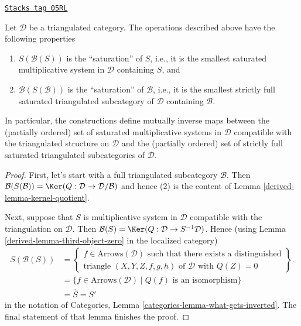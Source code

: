 \begin{lemma}[Operations]
\label{derived-lemma-operations}
\href{https://stacks.math.columbia.edu/tag/05RL}{\texttt{Stacks tag 05RL}}

Let $\mathcal{D}$ be a triangulated category. The operations described above
have the following properties
\begin{enumerate}
\item $S(\mathcal{B}(S))$ is the ``saturation'' of $S$, i.e., it is the
smallest saturated multiplicative system in $\mathcal{D}$ containing $S$, and
\item $\mathcal{B}(S(\mathcal{B}))$ is the ``saturation'' of $\mathcal{B}$,
i.e., it is the smallest strictly full saturated triangulated subcategory of
$\mathcal{D}$ containing $\mathcal{B}$.
\end{enumerate}
In particular, the constructions define mutually inverse maps between
the (partially ordered) set of saturated multiplicative systems in
$\mathcal{D}$ compatible with the triangulated structure on $\mathcal{D}$
and
the (partially ordered) set of strictly full saturated triangulated
subcategories of $\mathcal{D}$.
\end{lemma}

\begin{proof}

First, let's start with a full triangulated subcategory $\mathcal{B}$. Then
$\mathcal{B}(S(\mathcal{B})) =
\Ker(Q : \mathcal{D} \to \mathcal{D}/\mathcal{B})$
and hence (2) is the content of
Lemma \ref{derived-lemma-kernel-quotient}.

\medskip\noindent
Next, suppose that $S$ is multiplicative system in $\mathcal{D}$ compatible
with the triangulation on $\mathcal{D}$. Then
$\mathcal{B}(S) = \Ker(Q : \mathcal{D} \to S^{-1}\mathcal{D})$.
Hence (using
Lemma \ref{derived-lemma-third-object-zero}
in the localized category)
\begin{align*}
S(\mathcal{B}(S))
& =
\left\{
\begin{matrix}
f \in \text{Arrows}(\mathcal{D})
\text{ such that there exists a distinguished}\\
\text{triangle }(X, Y, Z, f, g, h) \text{ of }\mathcal{D}\text{ with }Q(Z) = 0
\end{matrix}
\right\}.
\\
& =
\{f \in \text{Arrows}(\mathcal{D}) \mid Q(f)\text{ is an isomorphism}\} \\
& = \hat S = S'
\end{align*}
in the notation of
Categories, Lemma \ref{categories-lemma-what-gets-inverted}.
The final statement of that lemma finishes the proof.
\end{proof}

